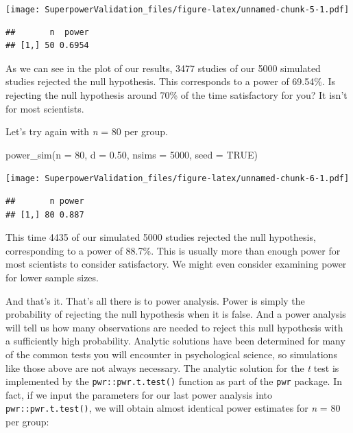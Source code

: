 \documentclass[
]{book}
\newenvironment{Shaded}{\begin{snugshade}}{\end{snugshade}}
\newcommand{\AttributeTok}[1]{\textcolor[rgb]{0.77,0.63,0.00}{#1}}
\newcommand{\ConstantTok}[1]{\textcolor[rgb]{0.00,0.00,0.00}{#1}}
\newcommand{\DecValTok}[1]{\textcolor[rgb]{0.00,0.00,0.81}{#1}}
\newcommand{\FloatTok}[1]{\textcolor[rgb]{0.00,0.00,0.81}{#1}}
\newcommand{\FunctionTok}[1]{\textcolor[rgb]{0.00,0.00,0.00}{#1}}
\newcommand{\NormalTok}[1]{#1}
\begin{document}
\texttt{[image: SuperpowerValidation\_files/figure-latex/unnamed-chunk-5-1.pdf]}

\begin{verbatim}
##       n  power
## [1,] 50 0.6954
\end{verbatim}

As we can see in the plot of our results, 3477 studies of our 5000 simulated studies rejected the null hypothesis. This corresponds to a power of 69.54\%. Is rejecting the null hypothesis around 70\% of the time satisfactory for you? It isn't for most scientists.

Let's try again with \emph{n} = 80 per group.

\begin{Shaded}
\begin{Highlighting}[]
\FunctionTok{power\_sim}\NormalTok{(}\AttributeTok{n =} \DecValTok{80}\NormalTok{, }\AttributeTok{d =} \FloatTok{0.50}\NormalTok{, }\AttributeTok{nsims =} \DecValTok{5000}\NormalTok{, }\AttributeTok{seed =} \ConstantTok{TRUE}\NormalTok{)}
\end{Highlighting}
\end{Shaded}

\texttt{[image: SuperpowerValidation\_files/figure-latex/unnamed-chunk-6-1.pdf]}

\begin{verbatim}
##       n power
## [1,] 80 0.887
\end{verbatim}

This time 4435 of our simulated 5000 studies rejected the null hypothesis, corresponding to a power of 88.7\%. This is usually more than enough power for most scientists to consider satisfactory. We might even consider examining power for lower sample sizes.

And that's it. That's all there is to power analysis. Power is simply the probability of rejecting the null hypothesis when it is false. And a power analysis will tell us how many observations are needed to reject this null hypothesis with a sufficiently high probability. Analytic solutions have been determined for many of the common tests you will encounter in psychological science, so simulations like those above are not always necessary. The analytic solution for the \emph{t} test is implemented by the \texttt{pwr::pwr.t.test()} function as part of the \texttt{pwr} package. In fact, if we input the parameters for our last power analysis into \texttt{pwr::pwr.t.test()}, we will obtain almost identical power estimates for \emph{n} = 80 per group:
\end{document}
